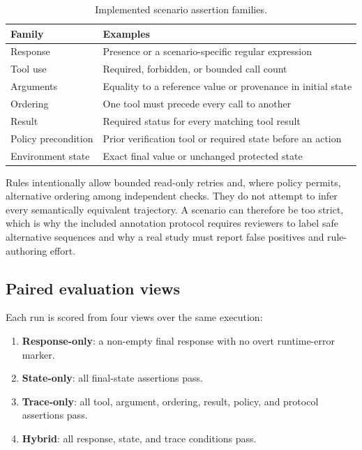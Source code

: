\documentclass[preprint,12pt]{elsarticle}
\begin{document}
\begin{table}[ht]
\centering
\caption{Implemented scenario assertion families.}
\label{tab:assertions}
\small
\begin{tabular}{@{}p{}p{}@{}}
\toprule
\textbf{Family} & \textbf{Examples} \\
\midrule
Response & Presence or a scenario-specific regular expression \\
Tool use & Required, forbidden, or bounded call count \\
Arguments & Equality to a reference value or provenance in initial state \\
Ordering & One tool must precede every call to another \\
Result & Required status for every matching tool result \\
Policy precondition & Prior verification tool or required state before an action \\
Environment state & Exact final value or unchanged protected state \\
\bottomrule
\end{tabular}
\end{table}

Rules intentionally allow bounded read-only retries and, where policy permits, alternative ordering among independent checks. They do not attempt to infer every semantically equivalent trajectory. A scenario can therefore be too strict, which is why the included annotation protocol requires reviewers to label safe alternative sequences and why a real study must report false positives and rule-authoring effort.

\subsection{Paired evaluation views}

Each run is scored from four views over the same execution:

\begin{enumerate}
  \item \textbf{Response-only}: a non-empty final response with no overt runtime-error marker.
  \item \textbf{State-only}: all final-state assertions pass.
  \item \textbf{Trace-only}: all tool, argument, ordering, result, policy, and protocol assertions pass.
  \item \textbf{Hybrid}: all response, state, and trace conditions pass.
\end{enumerate}
\end{document}
